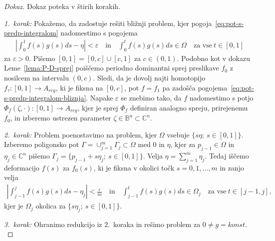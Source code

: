 \documentclass[12pt,a4paper,twoside]{article}
\theoremstyle{definition} %
\newenvironment{dokaz}[1][Dokaz]{\begin{proof}[#1]}{\end{proof}}
\theoremstyle{plain} %
\numberwithin{equation}{section}  %
\begin{document}
\begin{dokaz}
Dokaz poteka v štirih korakih.

\textit{1.~korak:} Pokažemo, da zadostuje rešiti bližnji problem, kjer pogoja~\eqref{eq:pot-s-predp-integralom} nadomestimo s pogojema
\begin{gather} \label{eq:pot-s-predp-integralom-bliznja}
\left| \int_{0}^{1} f(s)g(s)ds - \eta \right| < \varepsilon \quad \textrm{in} \quad \int_{0}^{t} f(s)g(s)ds \in \Omega \quad \textrm{za vse} \ t \in [0,1]
\end{gather}
za $\varepsilon > 0$.
Pišemo $[0,1] = [0,c] \cup [c,1]$ za $c \in (0,1)$.
Podobno kot v dokazu Leme~\ref{lema:P-D-sprej} poiščemo periodno dominantni sprej preslikave $f_0$ z nosilcem na intervalu $(0,c)$.
Sledi, da je dovolj najti homotopijo $f_{\tau} \colon [0,1] \to A_{reg}$, ki je fiksna na $[0,c]$, pot $f = f_{1}$ pa zadošča pogojema~\eqref{eq:pot-s-predp-integralom-bliznja}. Napake $\varepsilon$ se znebimo tako, da $f$ nadomestimo s potjo $\Phi_{f}(\zeta, \cdot) \colon [0,1] \to A_{reg}$, kjer je sprej $\Phi_{f}$ definiran analogno spreju, prirejenemu $f_0$, in izberemo ustrezen parameter $\zeta \in \mathbb{B}^{n} \subset \mathbb{C}^{n}$. \newline

\textit{2.~korak:} Problem poenostavimo na problem, kjer $\Omega$ vsebuje $\{ s\eta; \ s \in [0,1] \}$. \newline
Izberemo poligonsko pot $\Gamma = \cup_{j=1}^{m} \Gamma_{j} \subset \Omega$ med $0$ in $\eta$, kjer za $p_{j-1} \in \Omega$ in $\eta_{j} \in \mathbb{C}^{n}$ pišemo $\Gamma_{j} = \{ p_{j-1} + s\eta_{j}; \ s \in [0,1] \}$.
Velja $\eta = \sum_{j=1}^{m} \eta_{j}$.
Tedaj iščemo deformacijo $f(s)$ za $f_0(s)$, ki je fiksna v okolici točk $s = 0, 1, \dots , m$ in zanjo velja
\begin{gather*}
\left| \int_{j-1}^{j} f(s)g(s)ds - \eta_{j} \right| < \frac{\varepsilon}{m} \quad \textrm{in} \quad \int_{j-1}^{t} f(s)g(s)ds \in \Omega_{j} \quad \textrm{za vse} \ t \in [j-1,j],
\end{gather*}
kjer je $\Omega_{j}$ okolica za $\{ s \eta_{j}; \ s \in [0,1] \}$. \newline

\textit{3.~korak:} Ohranimo redukcijo iz 2.~koraka in rešimo problem za $0 \neq g = konst.$ \newline


\end{dokaz}
\end{document}
